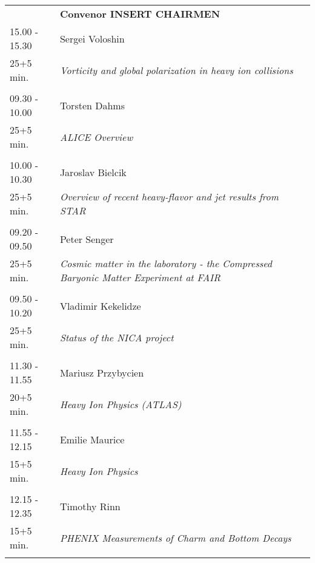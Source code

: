 \begin{longtable}{p{3cm}p{13cm}}
&\hfill {\bf Convenor INSERT CHAIRMEN }\\ 
15.00 - 15.30 & Sergei Voloshin\\ 
25+5 min. & {\it Vorticity and global polarization in heavy ion collisions}\\ 
 & \\ 
09.30 - 10.00 & Torsten Dahms\\ 
25+5 min. & {\it ALICE Overview}\\ 
 & \\ 
10.00 - 10.30 & Jaroslav Bielcik\\ 
25+5 min. & {\it Overview of recent heavy-flavor and jet results from STAR}\\ 
 & \\ 
09.20 - 09.50 & Peter Senger\\ 
25+5 min. & {\it Cosmic matter in the laboratory - the Compressed Baryonic Matter  Experiment at FAIR}\\ 
 & \\ 
09.50 - 10.20 & Vladimir Kekelidze\\ 
25+5 min. & {\it Status of the NICA project}\\ 
 & \\ 
11.30 - 11.55 & Mariusz Przybycien\\ 
20+5 min. & {\it Heavy Ion Physics (ATLAS)}\\ 
 & \\ 
11.55 - 12.15 & Emilie Maurice\\ 
15+5 min. & {\it Heavy Ion Physics}\\ 
 & \\ 
12.15 - 12.35 & Timothy Rinn\\ 
15+5 min. & {\it PHENIX Measurements of Charm and Bottom Decays}\\ 
 & \\ 
\end{longtable}

